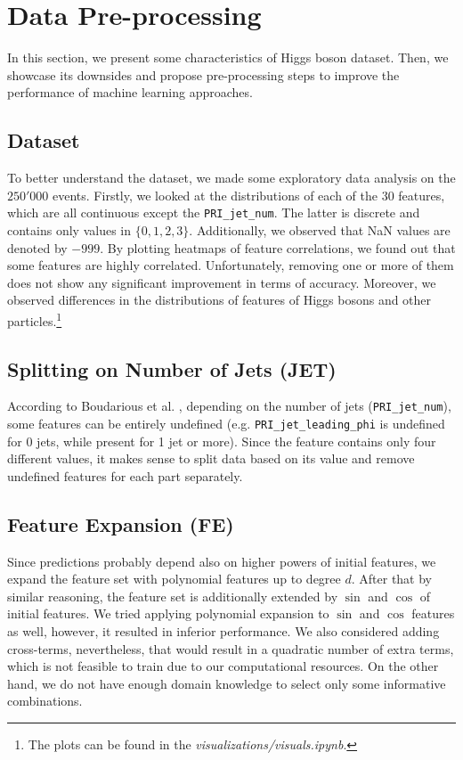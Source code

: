 \section{Data Pre-processing}
\label{preprocessing}

In this section, we present some characteristics of Higgs boson dataset. Then, we showcase its downsides and propose pre-processing steps to improve the performance of machine learning approaches.

\subsection{Dataset}

To better understand the dataset, we made some exploratory data analysis on the $250'000$ events. Firstly, we looked at the distributions of each of the $30$ features, which are all continuous except the \texttt{PRI\_jet\_num}. The latter is discrete and contains only values in $\{0, 1, 2, 3\}$. Additionally, we observed that NaN values are denoted by $-999$. By plotting heatmaps of feature correlations, we found out that some features are highly correlated. Unfortunately, removing one or more of them does not show any significant improvement in terms of accuracy. Moreover, we observed differences in the distributions of features of Higgs bosons and other particles.\footnote{The plots can be found in the \textit{visualizations/visuals.ipynb}.}



\subsection{Splitting on Number of Jets (JET)}

According to Boudarious et al. \cite{bourdarious2014}, depending on the number of jets (\texttt{PRI\_jet\_num}), some features can be entirely undefined (e.g. \texttt{PRI\_jet\_leading\_phi} is undefined for 0 jets, while present for 1 jet or more). Since the feature contains only four different values, it makes sense to split data based on its value and remove undefined features for each part separately. 



\subsection{Feature Expansion (FE)}

Since predictions probably depend also on higher powers of initial features, we expand the feature set with polynomial features up to degree $d$. After that by similar reasoning, the feature set is additionally extended by $\sin$ and $\cos$ of initial features. We tried applying polynomial expansion to $\sin$ and $\cos$ features as well, however, it resulted in inferior performance. We also considered adding cross-terms, nevertheless, that would result in a quadratic number of extra terms, which is not feasible to train due to our computational resources. On the other hand, we do not have enough domain knowledge to select only some informative combinations.



